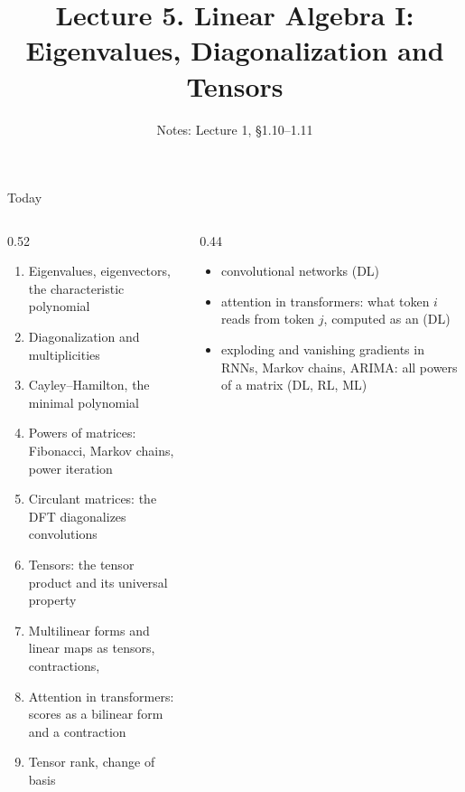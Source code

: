 \documentclass[aspectratio=1610,11pt]{beamer}
\title[Lecture 5 · Eigenvalues and Tensors]{Lecture 5. Linear Algebra I:\\ Eigenvalues, Diagonalization and Tensors}
\subtitle{Notes: Lecture 1, \S1.10--1.11}
\begin{document}
\begin{frame}[plain]
    \titlepage
\end{frame}

\begin{frame}{Today}
    \begin{columns}[T]
        \begin{column}{0.52\linewidth}
            \begin{enumerate}\small
                \item Eigenvalues, eigenvectors, the characteristic polynomial
                \item Diagonalization and multiplicities
                \item Cayley--Hamilton, the minimal polynomial
                \item Powers of matrices: Fibonacci, Markov chains, power iteration
                \item Circulant matrices: the DFT diagonalizes convolutions
                \item Tensors: the tensor product and its universal property
                \item Multilinear forms and linear maps as tensors, contractions, 
                \item Attention in transformers: scores as a bilinear form and a contraction
                \item Tensor rank, change of basis
            \end{enumerate}
        \end{column}
        \begin{column}{0.44\linewidth}
            \begin{mlbox}[Used in]
                \small
                \begin{itemize}
                    \item convolutional networks (DL)
                    \item attention in transformers: what token $i$ reads from token $j$, computed as an  (DL)
                    \item exploding and vanishing gradients in RNNs, Markov chains, ARIMA: all powers of a matrix (DL, RL, ML)
                \end{itemize}
            \end{mlbox}
        \end{column}
    \end{columns}
\end{frame}
\end{document}
